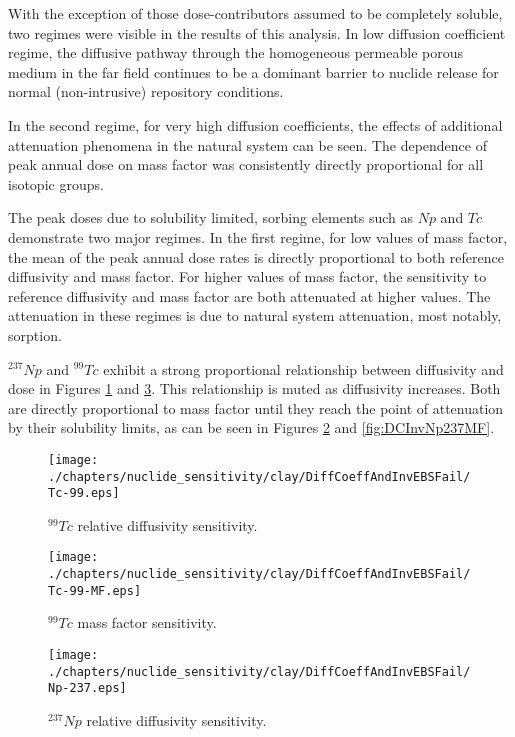 \begin{frame}[c]
\begin{frame}[c]
\begin{frame}[c]
\begin{frame}[c]
\begin{frame}[c]
\begin{frame}[c]
\begin{frame}[c]
\begin{frame}[c]
\begin{frame}[c]
With the exception of those dose-contributors assumed to be completely soluble, 
two regimes were visible in the results of this analysis. In low diffusion 
coefficient regime, the diffusive pathway through the homogeneous permeable 
porous medium in the far field continues to be a  dominant barrier to nuclide 
release for normal (non-intrusive) repository conditions. 

In the second regime, for very high diffusion coefficients, the effects of 
additional attenuation phenomena in the natural system can be seen.  The 
dependence of peak annual dose on mass factor was consistently directly 
proportional for all isotopic groups.

The peak doses due to solubility limited, sorbing elements such as $Np$ and 
$Tc$ demonstrate two major regimes. In the first regime, for 
low values of mass factor, the mean of the peak annual dose rates is directly 
proportional to both reference diffusivity and mass factor.  For higher values 
of mass factor, the sensitivity to reference diffusivity and mass factor are 
both attenuated at higher values.  The attenuation in these regimes 
is due to natural system attenuation, most notably, sorption.

$^{237}Np$ and $^{99}Tc$ exhibit a strong proportional relationship 
between diffusivity and dose in Figures \ref{fig:DCInvTc99} and 
\ref{fig:DCInvNp237}. This relationship is muted as diffusivity 
increases. Both are directly proportional to mass factor until they reach the 
point of attenuation by their solubility limits, as can be seen in 
Figures \ref{fig:DCInvTc99MF} and \ref{fig:DCInvNp237MF}.

\begin{figure}[ht!]
\centering
\texttt{[image: ./chapters/nuclide\_sensitivity/clay/DiffCoeffAndInvEBSFail/Tc-99.eps]}
\caption{$^{99}Tc$ relative diffusivity sensitivity.} 
\label{fig:DCInvTc99}
\end{figure}

\begin{figure}[ht!]
\centering
\texttt{[image: ./chapters/nuclide\_sensitivity/clay/DiffCoeffAndInvEBSFail/Tc-99-MF.eps]}
\caption{$^{99}Tc$ mass factor sensitivity.}
\label{fig:DCInvTc99MF}
\end{figure}


\begin{figure}[ht!]
\centering
\texttt{[image: ./chapters/nuclide\_sensitivity/clay/DiffCoeffAndInvEBSFail/Np-237.eps]}
\caption{$^{237}Np$ relative diffusivity sensitivity.} 
\label{fig:DCInvNp237}
\end{figure}


\end{frame}
\end{frame}
\end{frame}
\end{frame}
\end{frame}
\end{frame}
\end{frame}
\end{frame}
\end{frame}

